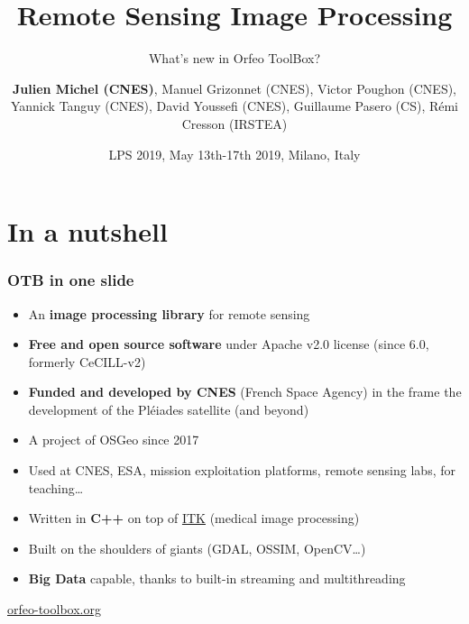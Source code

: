 \documentclass[8pt,aspectratio=169]{beamer}
\title{Remote Sensing Image Processing}
\subtitle{What's new in Orfeo ToolBox?}
\author{\textbf{Julien Michel (CNES)}, Manuel Grizonnet (CNES), Victor Poughon (CNES), Yannick Tanguy (CNES), David Youssefi (CNES), Guillaume Pasero (CS), Rémi Cresson (IRSTEA)}
\date{LPS 2019, May 13th-17th 2019, Milano, Italy}
\begin{document}
\begin{frame}
\titlepage
\end{frame}

\section{In a nutshell}

  \begin{frame}
    \frametitle{OTB in one slide}

      \begin{itemize}
      \item An \textbf{image processing library} for remote sensing
      \item \textbf{Free and open source software} under Apache v2.0 license (since 6.0, formerly CeCILL-v2)
      \item \textbf{Funded and developed by CNES} (French Space Agency) in the frame
        the development of the Pléiades satellite (and beyond)
      \item A project of OSGeo since 2017
      \item Used at CNES, ESA, mission exploitation platforms,
        remote sensing labs, for teaching\ldots
      \item Written in \textbf{C++} on top of \href{www.itk.org}{ITK} (medical image
        processing)
      \item Built on the shoulders of giants (GDAL, OSSIM, OpenCV\ldots)
      \item \textbf{Big Data} capable, thanks to built-in streaming and multithreading
      \end{itemize}

    
    \begin{center}
      {\huge\textcolor{red}{\href{http://www.orfeo-toolbox.org}{orfeo-toolbox.org}}}
    \end{center}
  \end{frame}
\end{document}

